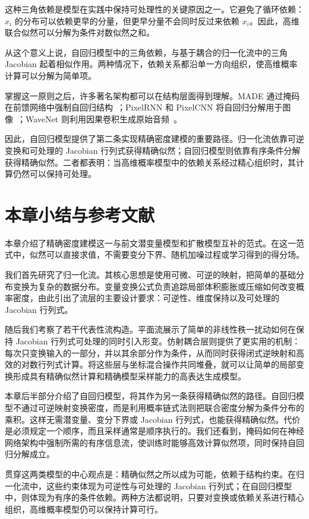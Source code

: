 这种三角依赖是模型在实践中保持可处理性的关键原因之一。它避免了循环依赖：$x_i$ 的分布可以依赖更早的分量，但更早分量不会同时反过来依赖 $x_i$。因此，高维联合似然可以分解为条件对数似然之和。

从这个意义上说，自回归模型中的三角依赖，与基于耦合的归一化流中的三角 Jacobian 起着相似作用。两种情况下，依赖关系都沿单一方向组织，使高维概率计算可以分解为简单项。

掌握这一原则之后，许多著名架构都可以在结构层面得到理解。MADE 通过掩码在前馈网络中强制自回归结构~\cite{germain2015made}；PixelRNN 和 PixelCNN 将自回归分解用于图像~\cite{oord2016pixel}；WaveNet 则利用因果卷积生成原始音频~\cite{oord2016wavenet}。

因此，自回归模型提供了第二条实现精确密度建模的重要路径。归一化流依靠可逆变换和可处理的 Jacobian 行列式获得精确似然；自回归模型则依靠有序条件分解获得精确似然。二者都表明：当高维概率模型中的依赖关系经过精心组织时，其计算仍然可以保持可处理。


\section*{本章小结与参考文献}

本章介绍了精确密度建模这一与前文潜变量模型和扩散模型互补的范式。在这一范式中，似然可以直接求值，不需要变分下界、随机加噪过程或学习得到的得分场。

我们首先研究了归一化流。其核心思想是使用可微、可逆的映射，把简单的基础分布变换为复杂的数据分布。变量变换公式负责追踪局部体积膨胀或压缩如何改变概率密度，由此引出了流层的主要设计要求：可逆性、维度保持以及可处理的 Jacobian 行列式。

随后我们考察了若干代表性流构造。平面流展示了简单的非线性秩一扰动如何在保持 Jacobian 行列式可处理的同时引入形变。仿射耦合层则提供了更实用的机制：每次只变换输入的一部分，并以其余部分作为条件，从而同时获得闭式逆映射和高效的对数行列式计算。将这些层与坐标混合操作共同堆叠，就可以让简单的局部变换形成具有精确似然计算和精确模型采样能力的高表达生成模型。

本章后半部分介绍了自回归模型，将其作为另一条获得精确似然的路径。自回归模型不通过可逆映射变换密度，而是利用概率链式法则把联合密度分解为条件分布的乘积。这样无需潜变量、变分下界或 Jacobian 行列式，也能获得精确似然。代价是必须规定一个顺序，而且采样通常是顺序执行的。我们还看到，掩码如何在神经网络架构中强制所需的有序信息流，使训练时能够高效计算似然项，同时保持自回归分解成立。

贯穿这两类模型的中心观点是：精确似然之所以成为可能，依赖于结构约束。在归一化流中，这些约束体现为可逆性与可处理的 Jacobian 行列式；在自回归模型中，则体现为有序的条件依赖。两种方法都说明，只要对变换或依赖关系进行精心组织，高维概率模型仍可以保持计算可行。

